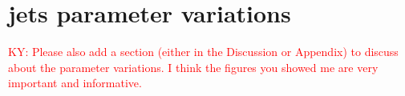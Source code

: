 \documentclass[fleqn,usenatbib,useAMS]{mnras}
\begin{document}





\appendix
\section{jets parameter variations}
\textcolor{red}{KY: Please also add a section (either in the Discussion
or Appendix) to discuss about the parameter variations.
I think the figures you showed me are very important
and informative.}



\end{document}

